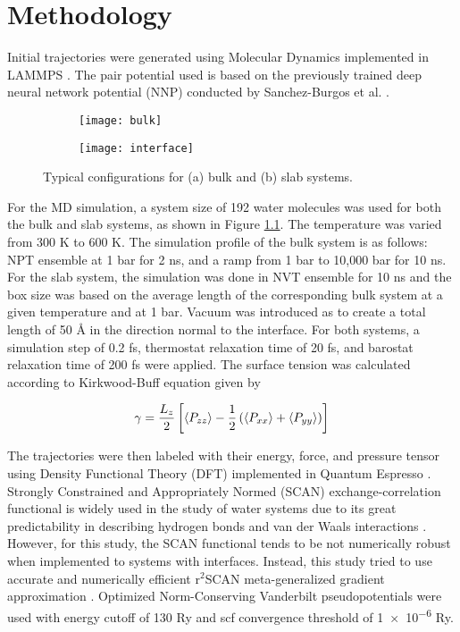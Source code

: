 \chapter{Methodology}
Initial trajectories were generated using Molecular Dynamics implemented in
LAMMPS \cite{LAMMPS}. The pair potential used is based on the previously
trained deep neural network potential (NNP) conducted by Sanchez-Burgos et al.
\cite{sanchez2023deep}.

\begin{figure}[tbhp]
    \centering
    \begin{subfigure}{0.4\textwidth}
        \centering
        \texttt{[image: bulk]}
        \caption{}
    \end{subfigure}
    \begin{subfigure}{0.4\textwidth}
        \centering
        \texttt{[image: interface]}
        \caption{}
    \end{subfigure}
    \hfill
    \caption{Typical configurations for (a) bulk and (b) slab systems.}
    \label{fig:cryst_sctruct}
\end{figure}

For the MD simulation, a system size of 192 water molecules was used for both
the bulk and slab systems, as shown in Figure \ref{fig:cryst_sctruct}. The
temperature was varied from 300 K to 600 K. The simulation profile of the bulk
system is as follows: NPT ensemble at 1 bar for 2 ns, and a ramp from 1 bar to
10,000 bar for 10 ns. For the slab system, the simulation was done in NVT
ensemble for 10 ns and the box size was based on the average length of the
corresponding bulk system at a given temperature and at 1 bar. Vacuum was
introduced as to create a total length of 50 \r{A} in the direction normal to
the interface. For both systems, a simulation step of 0.2 fs, thermostat
relaxation time of 20 fs, and barostat relaxation time of 200 fs were applied.
The surface tension was calculated according to Kirkwood-Buff equation
\cite{kirkwood1949} given by

\begin{equation}
    \gamma = \frac{L_z}{2} \left[ \expval{P_{zz}} -\frac{1}{2} \left(
        \expval{P_{xx}} + \expval{P_{yy}} \right) \right]
    \label{eq:surf_tens}
\end{equation}

The trajectories were then labeled with their energy, force, and pressure
tensor using Density Functional Theory (DFT) implemented in Quantum Espresso
\cite{QE-2009,QE-2017,QE-2020}. Strongly Constrained and Appropriately Normed
(SCAN) exchange-correlation functional is widely used in the study of water
systems due to its great predictability in describing hydrogen bonds and van
der Waals interactions \cite{sun2015strongly, chen2017ab}. However, for this
study, the SCAN functional tends to be not numerically robust when implemented
to systems with interfaces. Instead, this study tried to use accurate and
numerically efficient r$^2$SCAN meta-generalized gradient approximation
\cite{Furness2020}. Optimized Norm-Conserving Vanderbilt pseudopotentials
\cite{hamann2013optimized} were used with energy cutoff of 130 Ry and scf
convergence threshold of \num{1e-6} Ry.

